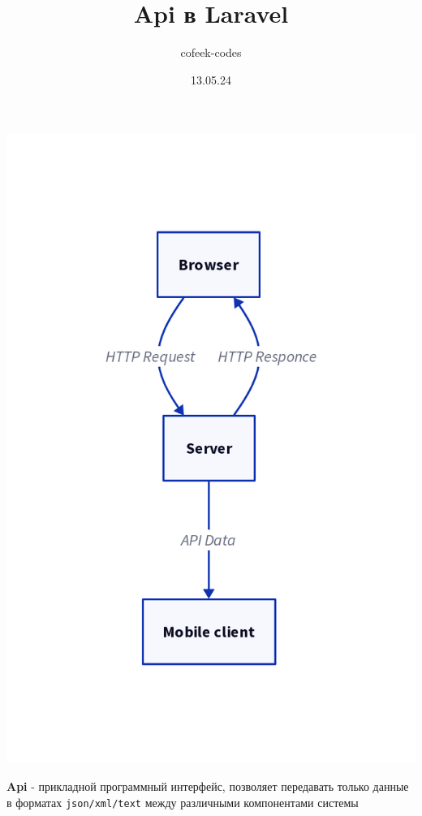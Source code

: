 \documentclass[11pt]{article}
\author{cofeek-codes}
\date{13.05.24}
\title{Api в Laravel}
\begin{document}
\maketitle
\tableofcontents

\begin{center}
\includegraphics[width=.9\linewidth]{./api.png}
\end{center}


\textbf{Api} - прикладной программный интерфейс, позволяет передавать только данные в форматах \texttt{json/xml/text} между различными компонентами системы
\end{document}
